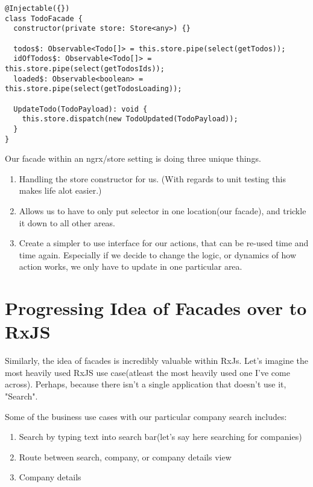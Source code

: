 \begin{lstlisting}[caption=todo.facade.ts]
@Injectable({})
class TodoFacade {
  constructor(private store: Store<any>) {}

  todos$: Observable<Todo[]> = this.store.pipe(select(getTodos));
  idOfTodos$: Observable<Todo[]> = this.store.pipe(select(getTodosIds));
  loaded$: Observable<boolean> = this.store.pipe(select(getTodosLoading));

  UpdateTodo(TodoPayload): void {
    this.store.dispatch(new TodoUpdated(TodoPayload));
  }
}  
\end{lstlisting}

Our facade within an ngrx/store setting is doing three unique things.
\begin{enumerate}
  \item Handling the store constructor for us. (With regards to unit testing this makes life alot easier.)
  \item Allows us to have to only put selector in one location(our facade), and trickle it down to all other areas. 
  \item Create a simpler to use interface for our actions, that can be re-used time and time again. Especially if we decide to change the logic, or dynamics of how action works, we only have to update in one particular area. 
\end{enumerate}

\section{Progressing Idea of Facades over to RxJS}
Similarly, the idea of facades is incredibly valuable within RxJs. Let's imagine the most heavily used RxJS use case(atleast the most heavily used one I've come across). Perhaps, because there isn't a single application that doesn't use it, "Search".

Some of the business use cases with our particular company search includes: 
\begin{enumerate}
  \item Search by typing text into search bar(let's say here searching for companies)
  \item Route between search, company, or company details view 
  \item Company details
\end{enumerate}

